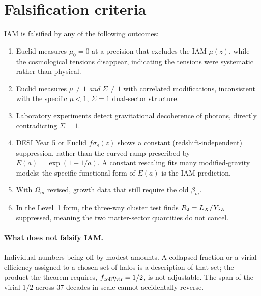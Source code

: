 \section{Falsification criteria}\label{sec:vt_falsify}
IAM is falsified by any of the following outcomes:
\begin{enumerate}
\item Euclid measures $\mu_0=0$ at a precision that excludes the IAM $\mu(z)$, while the cosmological tensions disappear, indicating the tensions were
systematic rather than physical.
\item Euclid measures $\mu\neq1$ \emph{and} $\Sigma\neq1$ with correlated modifications, inconsistent with the specific $\mu<1$, $\Sigma=1$ dual-sector
structure.
\item Laboratory experiments detect gravitational decoherence of photons, directly contradicting $\Sigma=1$.
\item DESI Year 5 or Euclid $f\sigma_8(z)$ shows a constant (redshift-independent) suppression, rather than the curved ramp prescribed by
$E(a)=\exp(1-1/a)$. A constant rescaling fits many modified-gravity models; the specific functional form of $E(a)$ is the IAM prediction.
\item With $\Omega_m$ revised, growth data that still require the old $\beta_m$.
\item In the Level~1 form, the three-way cluster test finds $R_2=L_X/Y_{\rm SZ}$ suppressed, meaning the two matter-sector quantities do not cancel.
\end{enumerate}
\paragraph{What does not falsify IAM.} Individual numbers being off by modest amounts. A collapsed fraction or a virial efficiency assigned to a chosen set of
halos is a description of that set; the product the theorem requires, $f_{\rm coll}\eta_{\rm vir}=1/2$, is not adjustable. The span of the
virial $1/2$ across 37 decades in scale cannot accidentally reverse.

